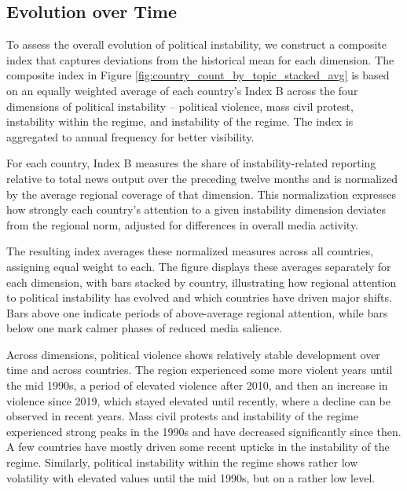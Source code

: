 \documentclass[12pt,a4paper,fleqn]{article}
\begin{document}
\subsection{Evolution over Time}\label{sec:evolution_over_time}

To assess the overall evolution of political instability, we construct a composite index that captures deviations from the historical mean for each dimension. The composite index in Figure \ref{fig:country_count_by_topic_stacked_avg} is based on an equally weighted average of each country’s Index B across the four dimensions of political instability -- political violence, mass civil protest, instability within the regime, and instability of the regime. The index is aggregated to annual frequency for better visibility.

For each country, Index B measures the share of instability-related reporting relative to total news output over the preceding twelve months and is normalized by the average regional coverage of that dimension. This normalization expresses how strongly each country’s attention to a given instability dimension deviates from the regional norm, adjusted for differences in overall media activity.

The resulting index averages these normalized measures across all countries, assigning equal weight to each. The figure displays these averages separately for each dimension, with bars stacked by country, illustrating how regional attention to political instability has evolved and which countries have driven major shifts. Bars above one indicate periods of above-average regional attention, while bars below one mark calmer phases of reduced media salience.

Across dimensions, political violence shows relatively stable development over time and across countries. The region experienced some more violent years until the mid 1990s, a period of elevated violence after 2010, and then an increase in violence since 2019, which stayed elevated until recently, where a decline can be observed in recent years. Mass civil protests and instability of the regime experienced strong peaks in the 1990s and have decreased significantly since then. A few countries have mostly driven some recent upticks in the instability of the regime. Similarly, political instability within the regime shows rather low volatility with elevated values until the mid 1990s, but on a rather low level.
\end{document}
